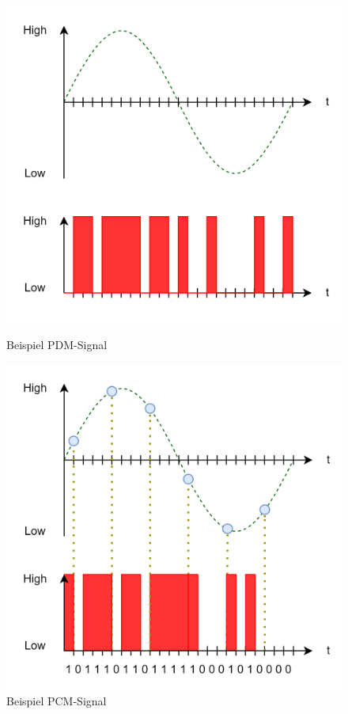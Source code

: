 \documentclass[12pt]{article}
\begin{document}
	\begin{figure}[H]
		\centering
		\begin{minipage}{.5\textwidth}
			\centering
			\includegraphics[width=1\linewidth]{images/BAT_PDM}
			\caption{Beispiel PDM-Signal}
			\label{fig:batpdm}
		\end{minipage}%
		\begin{minipage}{.5\textwidth}
			\centering
			\includegraphics[width=0.97\linewidth]{images/BAT_PCM}
			\caption{Beispiel PCM-Signal}
			\label{fig:batpcm}
		\end{minipage}
	\end{figure}
\end{document}
